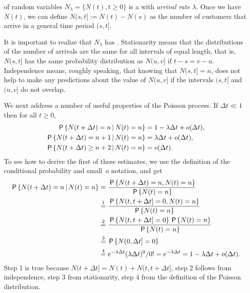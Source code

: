 \documentclass[queueing-book.tex]{subfiles}
\begin{document}
 of random variables $N_\lambda=\{N(t), t\geq 0\}$ is a  with \emph{arrival rate} $\lambda$.
Once we have $N(t)$, we can define $N(s, t] := N(t)-N(s)$ as the number of customers that arrive in a general time period $(s, t]$.\sidenote{Note that $[0,t]$ is closed at both ends, but $(s,t]$ is open at the left.}

It is important to realize that  $N_\lambda$ has .
Stationarity means that the distributions of the number of arrivals are the same for all intervals of equal length, that is,
$N(s,t]$ has the same probability distribution as $N(u, v]$ if $t-s = v-u$.
Independence means, roughly speaking, that knowing that $N(s,t]= n$, does not help to make any predictions about the value of $N(u, v]$ if the intervals $(s,t]$ and $(u, v]$ do not overlap.

We next address a number of useful properties of the Poisson process.
If $\Delta t\ll 1$ then for all $t\geq 0$,
\begin{subequations}\label{eq:32}
\begin{align}
\,\mathsf{P}\left\{N(t+\Delta t) = n \,\middle|\, N(t) = n\right\} &= 1-\lambda \Delta t + o(\Delta t),  \\
\,\mathsf{P}\left\{N(t+\Delta t) = n+1 \,\middle|\, N(t) = n\right\} &= \lambda \Delta t + o(\Delta t), \label{eq:8} \\
\,\mathsf{P}\left\{N(t+\Delta t) \geq n+2 \,\middle|\, N(t) = n\right\} &= o(\Delta t).\label{eq:10}
\end{align}
\end{subequations}
To see how to derive the first of these estimates,  we use the definition of the conditional probability and small~$o$ notation, and get
 \begin{align*}
 \,\mathsf{P}\left\{N(t+\Delta t) = n \,\middle|\, N(t) = n\right\}
&= \frac{\,\mathsf{P}\left\{N(t+\Delta t) = n, N(t) = n\right\}}{\,\mathsf{P}\left\{N(t)=n\right\}} \\
&\stackrel1= \frac{\,\mathsf{P}\left\{N(t, t+\Delta t] = 0, N(t) = n\right\}}{\,\mathsf{P}\left\{N(t)=n\right\}} \\
&\stackrel2= \frac{\,\mathsf{P}\left\{N(t, t+\Delta t] = 0\right\} \,\mathsf{P}\left\{N(t) = n\right\}}{\,\mathsf{P}\left\{N(t)=n\right\}} \\
&\stackrel3= \,\mathsf{P}\left\{N(0, \Delta t] = 0\right\} \\
&\stackrel4= e^{-\lambda \Delta t} (\lambda \Delta t)^0/0!
= e^{-\lambda \Delta t} = 1-\lambda \Delta t + o(\Delta t).
 \end{align*}
Step 1 is true because $N(t+\Delta t]= N(t) + N(t, t+\Delta t]$, step 2 follows from independence, step 3 from stationarity, step 4 from the definition of the Poisson distribution.
\end{document}

